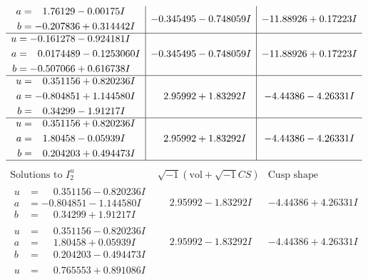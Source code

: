 \documentclass[1p]{elsarticle_modified}
\theoremstyle{definition}
\newcommand{\I}{\sqrt{-1}}
\begin{document}
$$\begin{array}{c|c|c}
\begin{aligned}
a &= \phantom{-}1.76129 - 0.00175 I \\
b &= -0.207836 + 0.314442 I\end{aligned}
 & -0.345495 - 0.748059 I & -11.88926 + 0.17223 I \\ \hline\begin{aligned}
u &= -0.161278 - 0.924181 I \\
a &= \phantom{-}0.0174489 - 0.1253060 I \\
b &= -0.507066 + 0.616738 I\end{aligned}
 & -0.345495 - 0.748059 I & -11.88926 + 0.17223 I \\ \hline\begin{aligned}
u &= \phantom{-}0.351156 + 0.820236 I \\
a &= -0.804851 + 1.144580 I \\
b &= \phantom{-}0.34299 - 1.91217 I\end{aligned}
 & \phantom{-}2.95992 + 1.83292 I & -4.44386 - 4.26331 I \\ \hline\begin{aligned}
u &= \phantom{-}0.351156 + 0.820236 I \\
a &= \phantom{-}1.80458 - 0.05939 I \\
b &= \phantom{-}0.204203 + 0.494473 I\end{aligned}
 & \phantom{-}2.95992 + 1.83292 I & -4.44386 - 4.26331 I\\
 \hline 
 \end{array}$$\newpage$$\begin{array}{c|c|c}  
\text{Solutions to }I^u_{2}& \I (\text{vol} + \sqrt{-1}CS) & \text{Cusp shape}\\
 \hline 
\begin{aligned}
u &= \phantom{-}0.351156 - 0.820236 I \\
a &= -0.804851 - 1.144580 I \\
b &= \phantom{-}0.34299 + 1.91217 I\end{aligned}
 & \phantom{-}2.95992 - 1.83292 I & -4.44386 + 4.26331 I \\ \hline\begin{aligned}
u &= \phantom{-}0.351156 - 0.820236 I \\
a &= \phantom{-}1.80458 + 0.05939 I \\
b &= \phantom{-}0.204203 - 0.494473 I\end{aligned}
 & \phantom{-}2.95992 - 1.83292 I & -4.44386 + 4.26331 I \\ \hline\begin{aligned}
u &= \phantom{-}0.765553 + 0.891086 I \\

\end{aligned}
\end{array}$$
\end{document}
